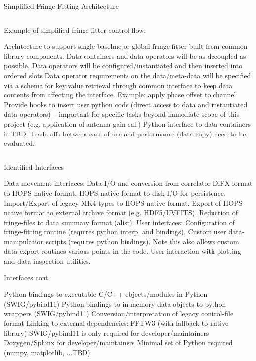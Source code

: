 \documentclass[8pt]{beamer}
\begin{document}
\begin{frame}{Simplified Fringe Fitting Architecture}
\begin{columns}[T]
\begin{column}{.6\textwidth}
\begin{minipage}{8cm}
Example of simplified fringe-fitter control flow.
    \begin{outline}
        \1 Architecture to support single-baseline or global fringe fitter built from common library components.
        \1 Data containers and data operators will be as decoupled as possible.
        \1 Data operators will be configured/instantiated and then inserted into ordered slots
        \1 Data operator requirements on the data/meta-data will be specified via a schema for key:value retrieval through common interface to keep data contents from affecting the interface. Example: apply phase offset to channel.
        \1 Provide hooks to insert user python code (direct access to data and instantiated data operators) -- important for specific tasks beyond immediate scope of this project (e.g. application of antenna gain cal.)
        \1 Python interface to data containers is TBD. Trade-offs between ease of use
        and performance (data-copy) need to be evaluated.
    \end{outline}
    \end{minipage}
    \end{column}
  \end{columns}
  
\end{frame}

\begin{frame}{Identified Interfaces}
    \begin{outline}
    \1 Data movement interfaces:
        \2 Data I/O and conversion from correlator DiFX format to HOPS native format.
        \2 HOPS native format to disk I/O for persistence.
        \2 Import/Export of legacy MK4-types to HOPS native format.  
        \2 Export of HOPS native format to external archive format (e.g. HDF5/UVFITS).
        \2 Reduction of fringe-files to data summary format (alist).
    \1 User interfaces:
        \2 Configuration of fringe-fitting routine (requires python interp. and bindings).
        \2 Custom user data-manipulation scripts (requires python bindings). Note this also allows custom data-export routines various points in the code.
        \2 User interaction with plotting and data inspection utilities.
    \end{outline}
\end{frame}

\begin{frame}{Interfaces cont.}
\begin{outline}
    \1 Python bindings to executable C/C++ objects/modules in Python (SWIG/pybind11)
    \1 Python bindings to in-memory data objects to python wrappers (SWIG/pybind11)
    \1 Conversion/interpretation of legacy control-file format
    \1 Linking to external dependencies:
        \2 FFTW3 (with fallback to native library)
        \2 SWIG/pybind11 is only required for developer/maintainers
        \2 Doxygen/Sphinx for developer/maintainers
        \2 Minimal set of Python required (numpy, matplotlib, ...TBD)
\end{outline}
\end{frame}
\end{document}
